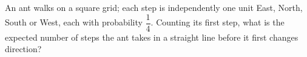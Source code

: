 An ant walks on a square grid; each step is independently one unit East, North, South or West, each with probability $\dfrac14$. Counting its first step, what is the expected number of steps the ant takes in a straight line before it first changes direction?
